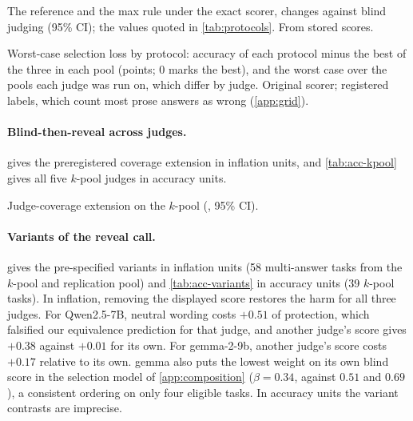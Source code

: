 \begin{table}[htbp]
\centering
\footnotesize
\caption{The reference and the max rule under the exact scorer, changes against blind judging (95\% CI); the values quoted in \cref{tab:protocols}. From stored scores.\ph}
\label{tab:protocol-exact}
\begin{adjustbox}{max width=\linewidth}\end{adjustbox}
\end{table}

\begin{table}[htbp]
\centering
\footnotesize
\caption{Worst-case selection loss by protocol: accuracy of each protocol minus the best of the three in each pool (points; 0 marks the best), and the worst case over the pools each judge was run on, which differ by judge. Original scorer; registered labels, which count most prose answers as wrong (\cref{app:grid}).\ph}
\label{tab:regret}
\begin{adjustbox}{max width=\linewidth}\end{adjustbox}
\end{table}

\paragraph{Blind-then-reveal across judges.}
 gives the preregistered coverage extension in inflation units, and \cref{tab:acc-kpool} gives all five $k$-pool judges in accuracy units.

\begin{table}[htbp]
\centering
\caption{Judge-coverage extension on the $k$-pool (\sd, 95\% CI).\osf}
\label{tab:coverage}
\scriptsize
\setlength{\tabcolsep}{3pt}
\begin{adjustbox}{max width=\linewidth}\end{adjustbox}

\end{table}

\paragraph{Variants of the reveal call.}
 gives the pre-specified variants in inflation units (58 multi-answer tasks from the $k$-pool and replication pool) and \cref{tab:acc-variants} in accuracy units (39 $k$-pool tasks). In inflation, removing the displayed score restores the harm for all three judges. For Qwen2.5-7B, neutral wording costs $+0.51$  of protection, which falsified our equivalence prediction for that judge, and another judge's score gives $+0.38$ against $+0.01$ for its own. For gemma-2-9b, another judge's score costs $+0.17$  relative to its own. gemma also puts the lowest weight on its own blind score in the selection model of \cref{app:composition} ($\beta = 0.34$, against $0.51$ and $0.69$), a consistent ordering on only four eligible tasks. In accuracy units the variant contrasts are imprecise.

